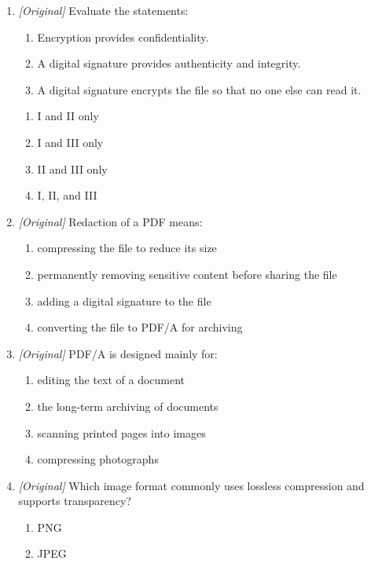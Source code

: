 \begin{enumerate}[label=\textbf{Q\arabic*.}, leftmargin=*]
\begin{enumerate}[label=\Alph*.]
    \item It permanently removes sensitive content from the file.
  \end{enumerate}
\item \textit{[Original]} Evaluate the statements:
  \begin{enumerate}[label=\Roman*.]
    \item Encryption provides confidentiality.
    \item A digital signature provides authenticity and integrity.
    \item A digital signature encrypts the file so that no one else can read
      it.
  \end{enumerate}
  \begin{enumerate}[label=\Alph*.]
    \item I and II only
    \item I and III only
    \item II and III only
    \item I, II, and III
  \end{enumerate}
\item \textit{[Original]} Redaction of a PDF means:
  \begin{enumerate}[label=\Alph*.]
    \item compressing the file to reduce its size
    \item permanently removing sensitive content before sharing the file
    \item adding a digital signature to the file
    \item converting the file to PDF/A for archiving
  \end{enumerate}
\item \textit{[Original]} PDF/A is designed mainly for:
  \begin{enumerate}[label=\Alph*.]
    \item editing the text of a document
    \item the long-term archiving of documents
    \item scanning printed pages into images
    \item compressing photographs
  \end{enumerate}
\item \textit{[Original]} Which image format commonly uses lossless
  compression and supports transparency?
  \begin{enumerate}[label=\Alph*.]
    \item PNG
    \item JPEG

\end{enumerate}
\end{enumerate}
